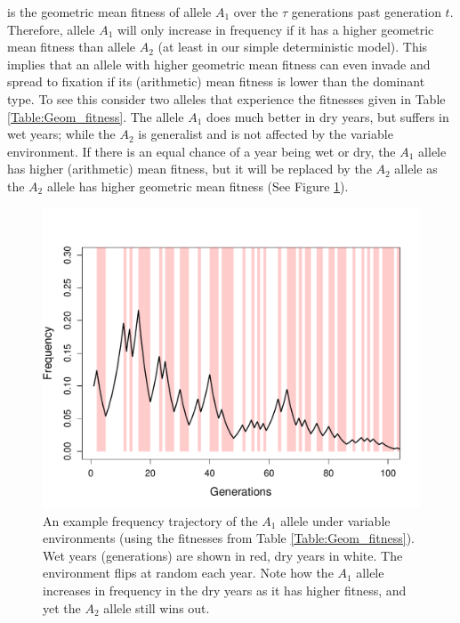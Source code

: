 is the geometric mean fitness of allele
 $A_1$ over the $\tau$ generations past generation $t$. Therefore, allele $A_1$ will only increase
in frequency if it has a higher geometric mean fitness than allele $A_2$
(at least in our simple deterministic model). This implies that an allele with higher
geometric mean fitness can even invade and spread to fixation if its
(arithmetic) mean fitness is lower than the dominant type.  To see
this consider two alleles that experience the fitnesses given in Table
\ref{Table:Geom_fitness}. The allele $A_1$ does much better in
dry years, but suffers in wet years; while the $A_2$ is generalist and
is not affected by the variable environment. If there is an equal
chance of a year being wet or dry, the $A_1$ allele has
higher (arithmetic) mean fitness, but it will be replaced by the $A_2$
allele as the $A_2$ allele has higher geometric mean fitness (See Figure \ref{fig:haploid_geo}). \\

\begin{figure}
\begin{center}
\includegraphics[width= \textwidth]{figures/Haploid_geom_traj.pdf}
\end{center}
\caption{An example frequency trajectory of the $A_1$ allele under
  variable environments (using the fitnesses from Table
  \ref{Table:Geom_fitness}). Wet years (generations) are shown in red, dry
  years in white. The environment flips at random each year.  Note how the $A_1$ allele increases in frequency in
  the dry years as it has higher fitness, and yet the $A_2$ allele
  still wins out. 
  } \label{fig:haploid_geo}
\end{figure}

